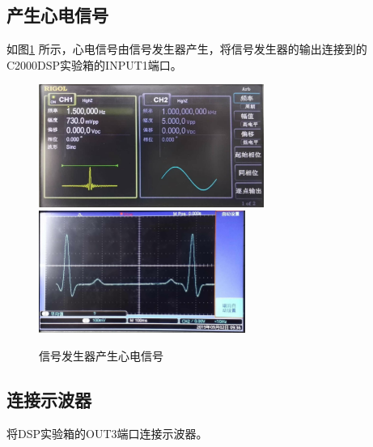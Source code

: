 \documentclass[12pt]{article}
\begin{document}
\subsection{产生心电信号}
如图\ref{xdxh}
所示，心电信号由信号发生器产生，将信号发生器的输出连接到的C2000DSP实验箱的INPUT1端口。
\begin{figure}[htbp]
  \centering
  \includegraphics[height=4cm]{10}\ \includegraphics[height=4cm]{01}
  \caption{信号发生器产生心电信号}\label{xdxh}
\end{figure}
\subsection{连接示波器}
将DSP实验箱的OUT3端口连接示波器。
\end{document}
